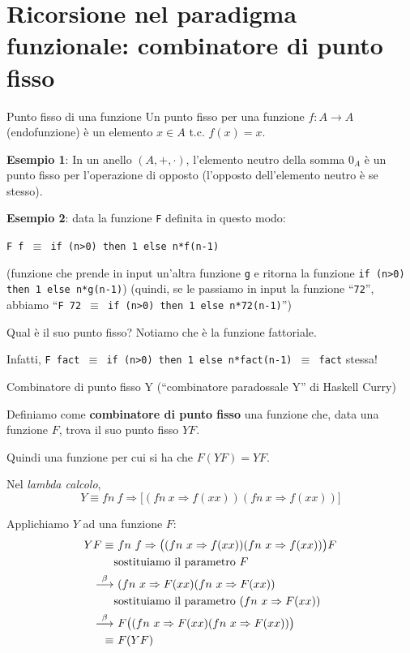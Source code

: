 \documentclass[a4paper,11pt]{report}
\newcommand{\brule}{\overset{\beta}{\longrightarrow}}
\begin{document}
\section{Ricorsione nel paradigma funzionale: combinatore di punto fisso}
\begin{defframe}{Punto fisso di una funzione}{}
    Un punto fisso per una funzione \( f: A\to A \) (endofunzione) è un elemento \( x \in A \) t.c. \( f(x) = x \).
\end{defframe}

\textbf{Esempio 1}: In un anello \( (A, +, \cdot) \), l'elemento neutro della somma \( 0_A \) è un punto fisso per l'operazione di opposto (l'opposto dell'elemento neutro è se stesso).

\textbf{Esempio 2}: data la funzione \texttt{F} definita in questo modo: 

\texttt{F f \(\equiv \) if (n>0) then 1 else n*f(n-1)}

(funzione che prende in input un'altra funzione \texttt{g} e ritorna la funzione \texttt{if (n>0) then 1 else n*g(n-1)})
{\color{gray}(quindi, se le passiamo in input la funzione ``\texttt{72}'', abbiamo ``\texttt{F 72 \(\equiv \) if (n>0) then 1 else n*72(n-1)}'')}

Qual è il suo punto fisso? Notiamo che è la funzione fattoriale.

Infatti, \texttt{F fact \(\equiv \) if (n>0) then 1 else n*fact(n-1) \( \equiv \) fact} stessa!

\begin{defframe}{Combinatore di punto fisso Y}{}
    (``combinatore paradossale Y'' di Haskell Curry)

    Definiamo come \textbf{combinatore di punto fisso} una funzione che, data una funzione \( F \), trova il suo punto fisso \( YF \).

    Quindi una funzione per cui si ha che \( F(YF) = YF \).

    Nel \textit{lambda calcolo},
    \[ Y \equiv fn \ f \Rightarrow \bigl[ \left(fn \ x \Rightarrow f(xx)\right)\left(fn \ x \Rightarrow f(xx)\right) \bigr] \]
    
\end{defframe}

Applichiamo \( Y \) ad una funzione \( F \):
\begin{align*}
    YF \equiv& \ fn \ f \Rightarrow \bigl((fn \ x \Rightarrow f(xx)) (fn \ x \Rightarrow f(xx))\bigr) F  \\
       &\text{sostituiamo il parametro \( F \)} \\
       \brule& \ (fn \ x \Rightarrow F(xx) (fn \ x \Rightarrow F(xx)) \\
        &\text{sostituiamo il parametro \((fn \ x \Rightarrow F(xx))\)} \\
       \brule& \ F\bigl((fn \ x \Rightarrow F(xx) (fn \ x \Rightarrow F(xx))\bigr) \\
       \equiv&\ F(YF)
  \end{align*}
\end{document}
